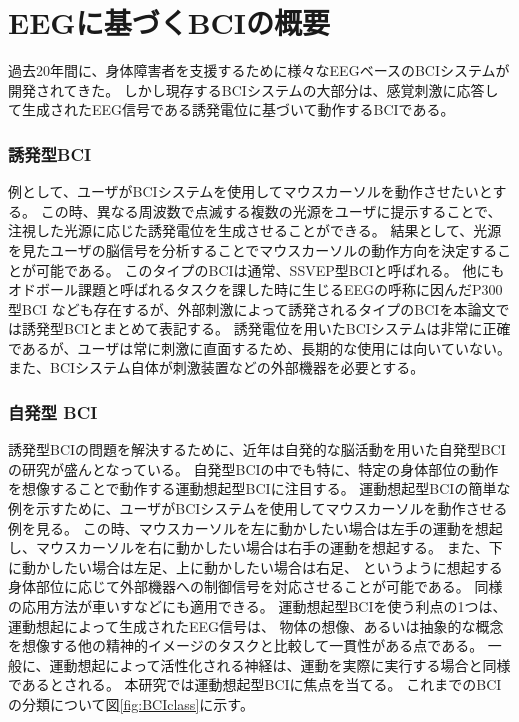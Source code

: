 \section{{\rm EEG}\mc に基づく{\rm BCI}{\mc の概要}}
過去20年間に、身体障害者を支援するために様々なEEGベースのBCIシステムが開発されてきた。
しかし現存するBCIシステムの大部分は、感覚刺激に応答して生成されたEEG信号である誘発電位に基づいて動作するBCIである。
\subsubsection{{\mc 誘発型}\rm BCI}
例として、ユーザがBCIシステムを使用してマウスカーソルを動作させたいとする。 
この時、異なる周波数で点滅する複数の光源をユーザに提示することで、
注視した光源に応じた誘発電位を生成させることができる。
結果として、光源を見たユーザの脳信号を分析することでマウスカーソルの動作方向を決定することが可能である。
このタイプのBCIは通常、SSVEP型BCIと呼ばれる。
他にもオドボール課題と呼ばれるタスクを課した時に生じるEEGの呼称に因んだP300型BCI
なども存在するが、外部刺激によって誘発されるタイプのBCIを本論文では誘発型BCIとまとめて表記する。
誘発電位を用いたBCIシステムは非常に正確であるが、ユーザは常に刺激に直面するため、長期的な使用には向いていない。
また、BCIシステム自体が刺激装置などの外部機器を必要とする。
\subsubsection{\mc 自発型 \rm BCI}
誘発型BCIの問題を解決するために、近年は自発的な脳活動を用いた自発型BCIの研究が盛んとなっている。
自発型BCIの中でも特に、特定の身体部位の動作を想像することで動作する運動想起型BCIに注目する。
運動想起型BCIの簡単な例を示すために、ユーザがBCIシステムを使用してマウスカーソルを動作させる例を見る。
この時、マウスカーソルを左に動かしたい場合は左手の運動を想起し、マウスカーソルを右に動かしたい場合は右手の運動を想起する。
また、下に動かしたい場合は左足、上に動かしたい場合は右足、
というように想起する身体部位に応じて外部機器への制御信号を対応させることが可能である。
同様の応用方法が車いすなどにも適用できる。
運動想起型BCIを使う利点の1つは、運動想起によって生成されたEEG信号は、
物体の想像、あるいは抽象的な概念を想像する他の精神的イメージのタスクと比較して一貫性がある点である。
一般に、運動想起によって活性化される神経は、運動を実際に実行する場合と同様であるとされる\cite{運動想起}。
本研究では運動想起型BCIに焦点を当てる。
これまでのBCIの分類について図\ref{fig:BCIclass}に示す。

